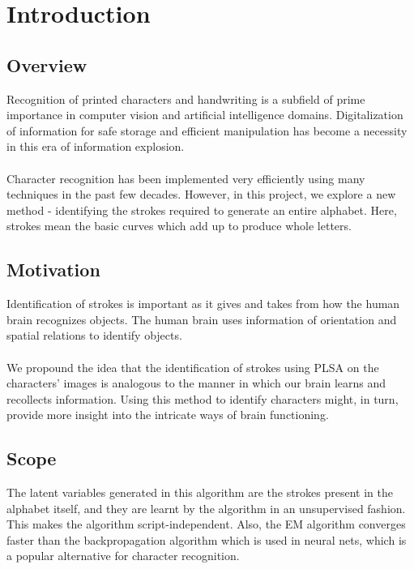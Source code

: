 \documentclass[10pt]{article}
\begin{document}
	\section{Introduction}
		\hrulefill
		\subsection{Overview}
			Recognition of printed characters and handwriting is a subfield of prime importance in computer vision and artificial intelligence domains. Digitalization of information for safe storage and efficient manipulation has become a necessity in this era of information explosion.\\\\
			Character recognition has been implemented very efficiently using many techniques in the past few decades. However, in this project, we explore a new method - identifying the strokes required to generate an entire alphabet. Here, strokes mean the basic curves which add up to produce whole letters. 
			
		\subsection{Motivation}
			Identification of strokes is important as it gives and takes from how the human brain recognizes objects. The human brain uses information of orientation and spatial relations to identify objects.\\\\
			We propound the idea that the identification of strokes using PLSA on the characters' images is analogous to the manner in which our brain learns and recollects information. Using this method to identify characters might, in turn, provide more insight into the intricate ways of brain functioning.
		\subsection{Scope}
			The latent variables generated in this algorithm are the strokes present in the alphabet itself, and they are learnt by the algorithm in an unsupervised fashion. This makes the algorithm script-independent. Also, the EM algorithm converges faster than the backpropagation algorithm  which is used in neural nets, which is a popular alternative for character recognition.
\end{document}
